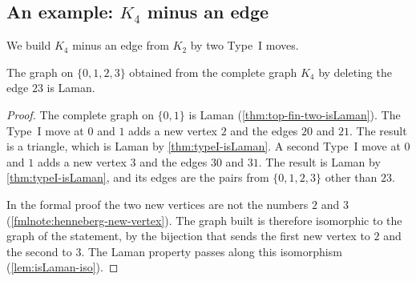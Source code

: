 \subsection{An example: \texorpdfstring{$K_4$}{K4} minus an edge}

We build $K_4$ minus an edge from $K_2$ by two Type~I moves.

\begin{theorem}
  \label{thm:top-fin-four-minus-edge-isLaman}
  \leanok
  The graph on $\{0, 1, 2, 3\}$ obtained from the complete graph $K_4$
  by deleting the edge $23$ is Laman.
\end{theorem}
\begin{proof}
  \leanok
  The complete graph on $\{0, 1\}$ is Laman
  (\cref{thm:top-fin-two-isLaman}). The Type~I move at $0$ and $1$
  adds a new vertex $2$ and the edges $20$ and $21$. The result is a
  triangle, which is Laman by \cref{thm:typeI-isLaman}. A second
  Type~I move at $0$ and $1$ adds a new vertex $3$ and the edges $30$
  and $31$. The result is Laman by \cref{thm:typeI-isLaman}, and its
  edges are the pairs from $\{0, 1, 2, 3\}$ other than $23$.

  In the formal proof the two new vertices are not the numbers $2$ and
  $3$ (\cref{fmlnote:henneberg-new-vertex}). The graph built is
  therefore isomorphic to the graph of the statement, by the bijection
  that sends the first new vertex to $2$ and the second to $3$. The
  Laman property passes along this isomorphism
  (\cref{lem:isLaman-iso}).
\end{proof}
